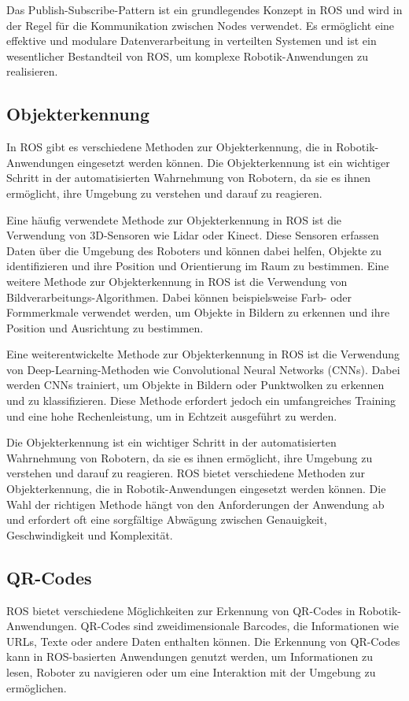     Das Publish-Subscribe-Pattern ist ein grundlegendes Konzept in \ac{ROS} und wird in der Regel für die Kommunikation zwischen Nodes verwendet. Es ermöglicht eine effektive und modulare Datenverarbeitung in verteilten Systemen und ist ein wesentlicher Bestandteil von \ac{ROS}, um komplexe Robotik-Anwendungen zu realisieren.

    \subsection{Objekterkennung} \label{objekterkennung:subsection}
    In \ac{ROS} gibt es verschiedene Methoden zur Objekterkennung, die in Robotik-Anwendungen eingesetzt werden können. Die Objekterkennung ist ein wichtiger Schritt in der automatisierten Wahrnehmung von Robotern, da sie es ihnen ermöglicht, ihre Umgebung zu verstehen und darauf zu reagieren.

    Eine häufig verwendete Methode zur Objekterkennung in \ac{ROS} ist die Verwendung von 3D-Sensoren wie Lidar oder Kinect. Diese Sensoren erfassen Daten über die Umgebung des Roboters und können dabei helfen, Objekte zu identifizieren und ihre Position und Orientierung im Raum zu bestimmen.
    Eine weitere Methode zur Objekterkennung in \ac{ROS} ist die Verwendung von Bildverarbeitungs-Algorithmen. Dabei können beispielsweise Farb- oder Formmerkmale verwendet werden, um Objekte in Bildern zu erkennen und ihre Position und Ausrichtung zu bestimmen.

    Eine weiterentwickelte Methode zur Objekterkennung in \ac{ROS} ist die Verwendung von Deep-Learning-Methoden wie Convolutional Neural Networks (CNNs). Dabei werden CNNs trainiert, um Objekte in Bildern oder Punktwolken zu erkennen und zu klassifizieren. Diese Methode erfordert jedoch ein umfangreiches Training und eine hohe Rechenleistung, um in Echtzeit ausgeführt zu werden.

    Die Objekterkennung ist ein wichtiger Schritt in der automatisierten Wahrnehmung von Robotern, da sie es ihnen ermöglicht, ihre Umgebung zu verstehen und darauf zu reagieren. \ac{ROS} bietet verschiedene Methoden zur Objekterkennung, die in Robotik-Anwendungen eingesetzt werden können. Die Wahl der richtigen Methode hängt von den Anforderungen der Anwendung ab und erfordert oft eine sorgfältige Abwägung zwischen Genauigkeit, Geschwindigkeit und Komplexität.

    \subsection{QR-Codes} \label{qr-codes:subsection}
    \ac{ROS} bietet verschiedene Möglichkeiten zur Erkennung von QR-Codes in Robotik-Anwendungen. QR-Codes sind zweidimensionale Barcodes, die Informationen wie URLs, Texte oder andere Daten enthalten können. Die Erkennung von QR-Codes kann in \ac{ROS}-basierten Anwendungen genutzt werden, um Informationen zu lesen, Roboter zu navigieren oder um eine Interaktion mit der Umgebung zu ermöglichen.

